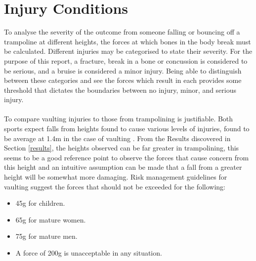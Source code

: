 \section{Injury Conditions}\label{injuries}

\noindent To analyse the severity of the outcome from someone falling or bouncing off a trampoline at different heights, the forces at which bones in the body break must be calculated. Different injuries may be categorised to state their severity. For the purpose of this report, a fracture, break in a bone or concussion is considered to be serious, and a bruise is considered a minor injury. Being able to distinguish between these categories and see the forces which result in each provides some threshold that dictates the boundaries between no injury, minor, and serious injury.%
\\
\\
\noindent To compare vaulting injuries to those from trampolining is justifiable. Both sports expect falls from heights found to cause various levels of injuries, found to be average at 1.4m in the case of vaulting \cite{gcalc}. From the Results discovered in Section \ref{results}, the heights observed can be far greater in trampolining, this seems to be a good reference point to observe the forces that cause concern from this height and an intuitive assumption can be made that a fall from a greater height will be somewhat more damaging. Risk management guidelines for vaulting \cite{gcalc} suggest the forces that should not be exceeded for the following:

\begin{itemize}
\item 45g for children.
\item 65g for mature women.
\item 75g for mature men.
\item A force of 200g is unacceptable in any situation.
\end{itemize}

